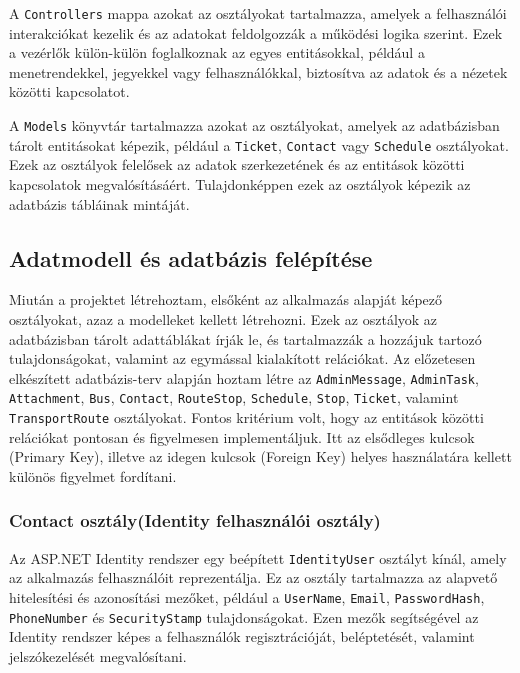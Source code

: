 A \texttt{Controllers} mappa azokat az osztályokat tartalmazza, amelyek a felhasználói interakciókat kezelik és az adatokat feldolgozzák a működési logika szerint. Ezek a vezérlők külön-külön foglalkoznak az egyes entitásokkal, például a menetrendekkel, jegyekkel vagy felhasználókkal, biztosítva az adatok és a nézetek közötti kapcsolatot.

A \texttt{Models} könyvtár tartalmazza azokat az osztályokat, amelyek az adatbázisban tárolt entitásokat képezik, például a \texttt{Ticket}, \texttt{Contact} vagy \texttt{Schedule} osztályokat. Ezek az osztályok felelősek az adatok szerkezetének és az entitások közötti kapcsolatok megvalósításáért. Tulajdonképpen ezek az osztályok képezik az adatbázis tábláinak mintáját.


\subsection{Adatmodell és adatbázis felépítése}

Miután a projektet létrehoztam, elsőként az alkalmazás alapját képező osztályokat, azaz a modelleket kellett létrehozni. Ezek az osztályok az adatbázisban tárolt adattáblákat írják le, és tartalmazzák a hozzájuk tartozó tulajdonságokat, valamint az egymással kialakított relációkat. Az előzetesen elkészített adatbázis-terv alapján hoztam létre az \texttt{AdminMessage}, \texttt{AdminTask}, \texttt{Attachment}, \texttt{Bus}, \texttt{Contact}, \texttt{RouteStop}, \texttt{Schedule}, \texttt{Stop}, \texttt{Ticket}, valamint \texttt{TransportRoute} osztályokat. Fontos kritérium volt, hogy az entitások közötti relációkat pontosan és figyelmesen implementáljuk. Itt az elsődleges kulcsok (Primary Key), illetve az idegen kulcsok (Foreign Key) helyes használatára kellett különös figyelmet fordítani.

\subsubsection{Contact osztály(Identity felhasználói osztály)}

Az ASP.NET Identity rendszer egy beépített \texttt{IdentityUser} osztályt kínál, amely az alkalmazás felhasználóit reprezentálja. Ez az osztály tartalmazza az alapvető hitelesítési és azonosítási mezőket, például a \texttt{UserName}, \texttt{Email}, \texttt{PasswordHash}, \texttt{PhoneNumber} és \texttt{SecurityStamp} tulajdonságokat. Ezen mezők segítségével az Identity rendszer képes a felhasználók regisztrációját, beléptetését, valamint jelszókezelését megvalósítani.

